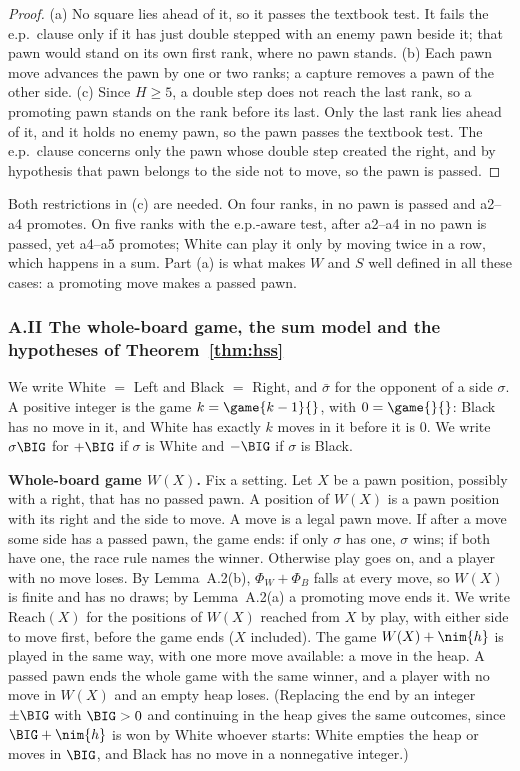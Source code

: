 \begin{proof}
(a) No square lies ahead of it, so it passes the textbook test. It fails the e.p.\ clause only if it has just double
stepped with an enemy pawn beside it; that pawn would stand on its own first rank, where no pawn stands. (b) Each pawn move
advances the pawn by one or two ranks; a capture removes a pawn of the other side. (c) Since $H\ge5$, a double step
does not reach the last rank, so a promoting pawn stands on the rank before its last. Only the last rank lies ahead of
it, and it holds no enemy pawn, so the pawn passes the textbook test. The e.p.\ clause concerns only the pawn whose double
step created the right, and by hypothesis that pawn belongs to the side not to move, so the pawn is passed.
\end{proof}

\noindent Both restrictions in (c) are needed. On four ranks, in  no pawn is passed and a2--a4
promotes. On five ranks with the e.p.-aware test, after a2--a4 in  no pawn is passed, yet a4--a5
promotes; White can play it only by moving twice in a row, which happens in a sum. Part (a) is what makes $W$ and
$S$ well defined in all these cases: a promoting move makes a passed pawn.

\subsubsection*{A.II The whole-board game, the sum model and the hypotheses of Theorem~\ref{thm:hss}}

We write White $=$ Left and Black $=$ Right, and $\bar\sigma$ for the opponent of a side $\sigma$. A positive integer is
the game $k=\game{k-1}{}$, with $0=\game{}{}$: Black has no move in it, and White has exactly $k$ moves in it before it is
$0$. We write $\sigma\BIG$ for $+\BIG$ if $\sigma$ is White and $-\BIG$ if $\sigma$ is Black.

\textbf{Whole-board game $W(X)$.} Fix a setting. Let $X$ be a pawn position, possibly with a right, that has no passed
pawn. A position of $W(X)$ is a pawn position with its right and the side to move. A move is a legal pawn move. If after a
move some side has a passed pawn, the game ends: if only $\sigma$ has one, $\sigma$ wins; if both have one, the race rule
names the winner. Otherwise play goes on, and a player with no move loses. By Lemma~A.2(b), $\Phi_W+\Phi_B$ falls at every
move, so $W(X)$ is finite and has no draws; by Lemma~A.2(a) a promoting move ends it. We write $\mathrm{Reach}(X)$ for the
positions of $W(X)$ reached from $X$ by play, with either side to move first, before the game ends ($X$ included). The
game $W(X)+\nim{h}$ is played in the same way, with one more move available: a move in the heap. A passed pawn ends the whole
game with the same winner, and a player with no move in $W(X)$ and an empty heap loses. (Replacing the end by an integer
$\pm\BIG$ with $\BIG>0$ and continuing in the heap gives the same outcomes, since $\BIG+\nim{h}$ is won by White whoever
starts: White empties the heap or moves in $\BIG$, and Black has no move in a nonnegative integer.)

